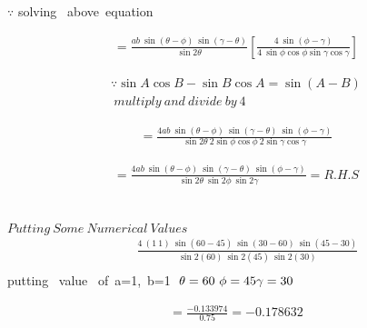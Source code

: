 \documentclass[journal,12pt,twocolumn]{IEEEtran}
\begin{document}
$\because$ solving ~above~equation 

\begin{multline}
=\frac{ab~\sin(\theta-\phi)~\sin(\gamma-\theta)}{ \sin2\theta}\left[\frac{4~\sin(\phi-\gamma)}{4~\sin\phi\cos\phi\sin\gamma\cos\gamma}
\right]
\end{multline}

\begin{align*}
\because \sin A\cos B - \sin B\cos A=\sin(A-B)\\
~multiply ~and ~divide ~by ~4
\end{align*}

\begin{multline}
=\frac{4ab~\sin(\theta-\phi)~\sin(\gamma-\theta)~\sin(\phi-\gamma)}{ \sin2\theta~2\sin\phi\cos\phi~2\sin\gamma\cos\gamma}
\end{multline}

\begin{multline}
=\frac{4ab~\sin(\theta-\phi)~\sin(\gamma-\theta)~\sin(\phi-\gamma)}{ \sin2\theta~\sin2\phi~\sin2\gamma} = R.H.S
\end{multline}
\\\\
$Putting ~Some ~Numerical~ Values$
\begin{multline}
~~~~~~~~\frac{4~(1~1)~\sin(60-45)~\sin(30-60)~\sin(45-30)}{ \sin2(60)~\sin2(45)~\sin2(30)}\\
\end{multline}
putting~ value~ of~a=1,~b=1 $~\theta=60~\phi=45 \\ \gamma=30$

\begin{multline}
=\frac{-0.133974}{0.75}=-0.178632\\
\end{multline}
\end{document}
